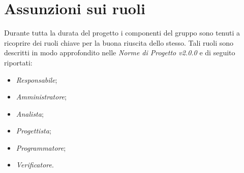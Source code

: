 \section{Assunzioni sui ruoli}
	Durante tutta la durata del progetto i componenti del gruppo sono tenuti a ricoprire dei ruoli chiave per la buona riuscita dello stesso.
	Tali ruoli sono descritti in modo approfondito nelle \textit{Norme di Progetto v2.0.0} e di seguito riportati:
	\begin{itemize}
		\item \textit{Responsabile};
		\item \textit{Amministratore};
		\item \textit{Analista};
		\item \textit{Progettista};
		\item \textit{Programmatore};
		\item \textit{Verificatore}.
	\end{itemize}
	\begin{comment}
		
	Ciascun ruolo ha un diverso costo. Di seguito verrà riportato, per ogni ruolo, il suo costo orario:

		\begin{tabularx}{\textwidth}{|c|c|}
			\hline
			\textbf{Ruolo} & \textbf{Costo} \\
			\hline
			Responsabile & 30 \euro \\
			Amministratore & 20 \euro \\
			Analista & 25 \euro \\
			Progettista & 22 \euro \\
			Programmatore & 15 \euro \\
			Verificatore & 15 \euro \\
			\hline
			\caption{Costi per ruolo}
		\end{tabularx}

	\end{comment}